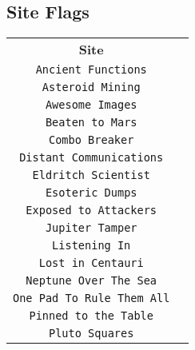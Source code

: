\documentclass[10pt]{article}
\begin{document}
\begin{center}
\section*{Site Flags}
\begin{tabular}{| c | c |}
\hline
\multirow{2}{*}{\bf\Large Site} & \hspace*{1.6in}\multirow{2}{*}{\bf\Large Flag}\hspace*{1.6in}\\&\\\hline
\multirow{2}{*}{{\tt Ancient Functions}} &\\&\\\hline
\multirow{2}{*}{{\tt Asteroid Mining}} &\\&\\\hline
\multirow{2}{*}{{\tt Awesome Images}} &\\&\\\hline
\multirow{2}{*}{{\tt Beaten to Mars}} &\\&\\\hline
\multirow{2}{*}{{\tt Combo Breaker}} &\\&\\\hline
\multirow{2}{*}{{\tt Distant Communications}} &\\&\\\hline
\multirow{2}{*}{{\tt Eldritch Scientist}} &\\&\\\hline
\multirow{2}{*}{{\tt Esoteric Dumps}} &\\&\\\hline
\multirow{2}{*}{{\tt Exposed to Attackers}} &\\&\\\hline
\multirow{2}{*}{{\tt Jupiter Tamper}} &\\&\\\hline
\multirow{2}{*}{{\tt Listening In}} &\\&\\\hline
\multirow{2}{*}{{\tt Lost in Centauri}} &\\&\\\hline
\multirow{2}{*}{{\tt Neptune Over The Sea}} &\\&\\\hline
\multirow{2}{*}{{\tt One Pad To Rule Them All}} &\\&\\\hline
\multirow{2}{*}{{\tt Pinned to the Table}} &\\&\\\hline
\multirow{2}{*}{{\tt Pluto Squares}} &\\&\\\hline

\end{tabular}
\end{center}
\end{document}
